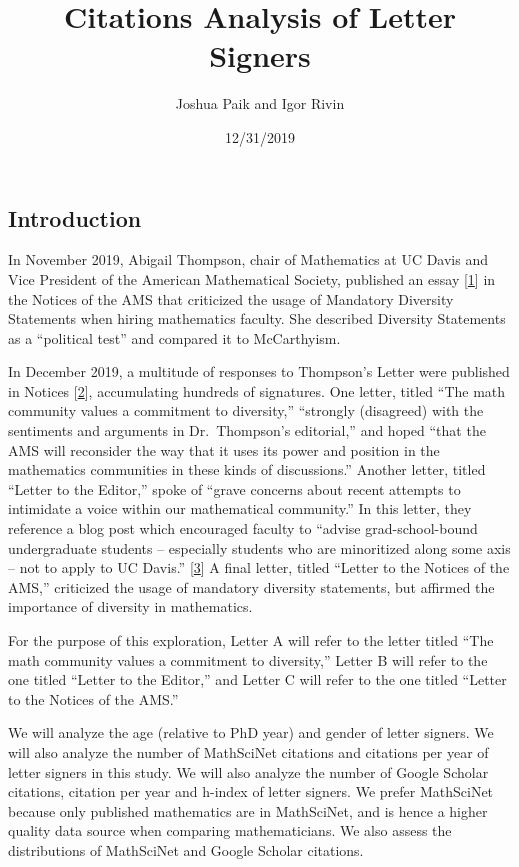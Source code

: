 \documentclass[]{article}
\title{Citations Analysis of Letter Signers}
\author{Joshua Paik and Igor Rivin}
\date{12/31/2019}
\begin{document}
\maketitle

{
\setcounter{tocdepth}{2}
\tableofcontents
}
\hypertarget{introduction}{%
\subsection{Introduction}\label{introduction}}

In November 2019, Abigail Thompson, chair of Mathematics at UC Davis and
Vice President of the American Mathematical Society, published an essay
{[}\protect\hyperlink{Bibliography}{1}{]} in the Notices of the AMS that
criticized the usage of Mandatory Diversity Statements when hiring
mathematics faculty. She described Diversity Statements as a ``political
test'' and compared it to McCarthyism.

In December 2019, a multitude of responses to Thompson's Letter were
published in Notices {[}\protect\hyperlink{Bibliography}{2}{]},
accumulating hundreds of signatures. One letter, titled ``The math
community values a commitment to diversity,'' ``strongly (disagreed)
with the sentiments and arguments in Dr.~Thompson's editorial,'' and
hoped ``that the AMS will reconsider the way that it uses its power and
position in the mathematics communities in these kinds of discussions.''
Another letter, titled ``Letter to the Editor,'' spoke of ``grave
concerns about recent attempts to intimidate a voice within our
mathematical community.'' In this letter, they reference a blog post
which encouraged faculty to ``advise grad-school-bound undergraduate
students -- especially students who are minoritized along some axis --
not to apply to UC Davis.'' {[}\protect\hyperlink{Bibliography}{3}{]} A
final letter, titled ``Letter to the Notices of the AMS,'' criticized
the usage of mandatory diversity statements, but affirmed the importance
of diversity in mathematics.

For the purpose of this exploration, Letter A will refer to the letter
titled ``The math community values a commitment to diversity,'' Letter B
will refer to the one titled ``Letter to the Editor,'' and Letter C will
refer to the one titled ``Letter to the Notices of the AMS.''

We will analyze the age (relative to PhD year) and gender of letter
signers. We will also analyze the number of MathSciNet citations and
citations per year of letter signers in this study. We will also analyze
the number of Google Scholar citations, citation per year and h-index of
letter signers. We prefer MathSciNet because only published mathematics
are in MathSciNet, and is hence a higher quality data source when
comparing mathematicians. We also assess the distributions of MathSciNet
and Google Scholar citations.
\end{document}
